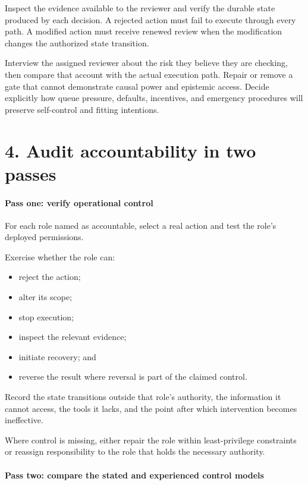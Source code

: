 Inspect the evidence available to the reviewer and verify the durable state produced by each decision. A rejected action must fail to execute through every path. A modified action must receive renewed review when the modification changes the authorized state transition.

Interview the assigned reviewer about the risk they believe they are checking, then compare that account with the actual execution path. Repair or remove a gate that cannot demonstrate causal power and epistemic access. Decide explicitly how queue pressure, defaults, incentives, and emergency procedures will preserve self-control and fitting intentions.

\section{4. Audit accountability in two passes}\label{audit-accountability-in-two-passes}

\paragraph{Pass one: verify operational control}\label{pass-one-verify-operational-control}

For each role named as accountable, select a real action and test the role's deployed permissions.

Exercise whether the role can:

\begin{itemize}
\tightlist
\item
  reject the action;
\item
  alter its scope;
\item
  stop execution;
\item
  inspect the relevant evidence;
\item
  initiate recovery; and
\item
  reverse the result where reversal is part of the claimed control.
\end{itemize}

Record the state transitions outside that role's authority, the information it cannot access, the tools it lacks, and the point after which intervention becomes ineffective.

Where control is missing, either repair the role within least-privilege constraints or reassign responsibility to the role that holds the necessary authority.

\paragraph{Pass two: compare the stated and experienced control models}\label{pass-two-compare-the-stated-and-experienced-control-models}

